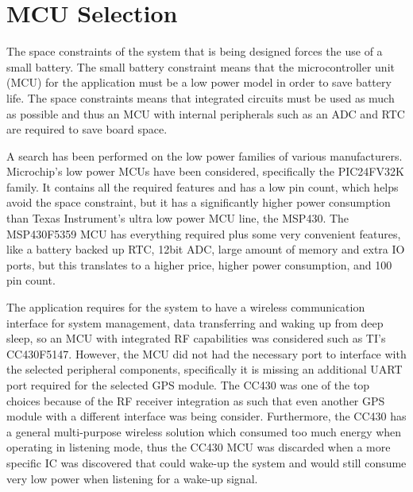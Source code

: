 \section{MCU Selection}
The space constraints of the system that is being designed forces the use of a small battery. The small battery constraint means that the microcontroller unit (MCU) for the application must be a low power model in order to save battery life. The space constraints means that integrated circuits must be used as much as possible and thus an MCU with internal peripherals such as an ADC and RTC are required to save board space. 

A search has been performed on the low power families of various manufacturers. Microchip’s low power MCUs have been considered, specifically the PIC24FV32K family. It contains all the required features and has a low pin count, which helps avoid the space constraint, but it has a significantly higher power consumption than Texas Instrument’s ultra low power MCU line, the MSP430. The MSP430F5359 MCU has everything required plus some very convenient features, like a battery backed up RTC, 12bit ADC, large amount of memory and extra IO ports, but this translates to a higher price, higher power consumption, and 100 pin count. 

The application requires for the system to have a wireless communication interface for system management, data transferring and waking up from deep sleep, so an MCU with integrated RF capabilities was considered such as TI’s CC430F5147. However, the MCU did not had the necessary port to interface with the selected peripheral components, specifically it is missing an additional UART port required for the selected GPS module. The CC430 was one of the top choices because of the RF receiver integration as such that even another GPS module with a different interface was being consider. Furthermore, the CC430 has a general multi-purpose wireless solution which consumed too much energy when operating in listening mode, thus the CC430 MCU was discarded when a more specific IC was discovered that could wake-up the system and would still consume very low power when listening for a wake-up signal. 

